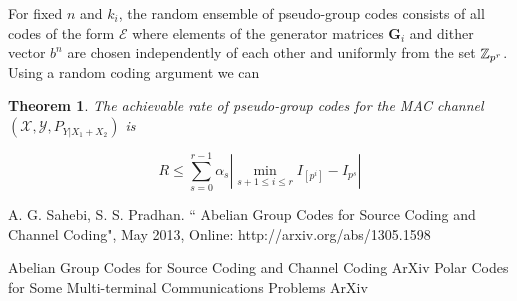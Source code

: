 \documentclass[conference]{IEEEtran}
\theoremstyle{plain}
\newtheorem{thm}{Theorem}
\theoremstyle{definition}
\theoremstyle{remark}
\begin{document}
For fixed $n$ and $k_i$, the random ensemble of pseudo-group codes consists of all codes of the form $\mathcal{E}$ where elements of the generator matrices $\mathbf{G}_i$ and dither vector $b^n$ are chosen independently of each other and uniformly from the set $\mathbb{Z}_{p^r}$. Using a random coding argument we can 



\begin{thm}
The achievable rate of pseudo-group codes for the MAC channel $(\mathcal{X},\mathcal{Y}, P_{Y|X_1+X_2})$ is

\begin{equation*}
R \leq \sum_{s=0}^{r-1} \alpha_s |\min_{s+1\leq i\leq r} I_{[p^i]}-I_{p^{s}}|
\end{equation*}
\end{thm}



















\begin{thebibliography}{1}
A. G. Sahebi, S. S. Pradhan. `` Abelian Group Codes for Source Coding and Channel Coding", May 2013, Online: http://arxiv.org/abs/1305.1598

Abelian Group Codes for Source Coding and Channel Coding
ArXiv
Polar Codes for Some Multi-terminal
Communications Problems
ArXiv

\end{thebibliography}
\end{document}
